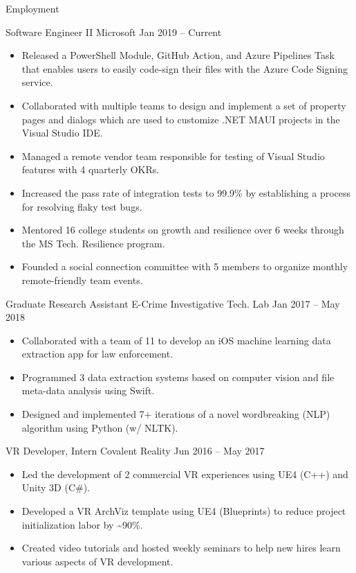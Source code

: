 \documentclass[]{mcdowellcv}
\begin{document}
	\makeheader
	
	\begin{cvsection}{Employment}
		\begin{cvsubsection} {Software Engineer II} {Microsoft} {Jan 2019 -- Current}
			\begin{itemize}
				\item Released a PowerShell Module, GitHub Action, and Azure Pipelines Task that enables users to easily code-sign their files with the Azure Code Signing service.
				\item Collaborated with multiple teams to design and implement a set of property pages and dialogs which are used to customize .NET MAUI projects in the Visual Studio IDE.	
				\item Managed a remote vendor team responsible for testing of Visual Studio features with 4 quarterly OKRs.
				\item Increased the pass rate of integration tests to 99.9\% by establishing a process for resolving flaky test bugs.	
				\item Mentored 16 college students on growth and resilience over 6 weeks through the MS Tech. Resilience program.
				\item Founded a social connection committee with 5 members to organize monthly remote-friendly team events.
			\end{itemize}
		\end{cvsubsection}

		\begin{cvsubsection} {Graduate Research Assistant} {E-Crime Investigative Tech. Lab} {Jan 2017 -- May 2018}
			\begin{itemize}
				\item Collaborated with a team of 11 to develop an iOS machine learning data extraction app for law enforcement.
				\item Programmed 3 data extraction systems based on computer vision and file meta-data analysis using Swift.
				\item Designed and implemented 7+ iterations of a novel wordbreaking (NLP) algorithm using Python (w/ NLTK).
			\end{itemize}
		\end{cvsubsection}
		
		\begin{cvsubsection} {VR Developer, Intern} {Covalent Reality} {Jun 2016 -- May 2017}
			\begin{itemize}
				\item Led the development of 2 commercial VR experiences using UE4 (C++) and Unity 3D (C\#).
				\item Developed a VR ArchViz template using UE4 (Blueprints) to reduce project initialization labor by \~{}90\%.
				\item Created video tutorials and hosted weekly seminars to help new hires learn various aspects of VR development.
			\end{itemize}
		\end{cvsubsection}
		

\end{cvsection}
\end{document}
